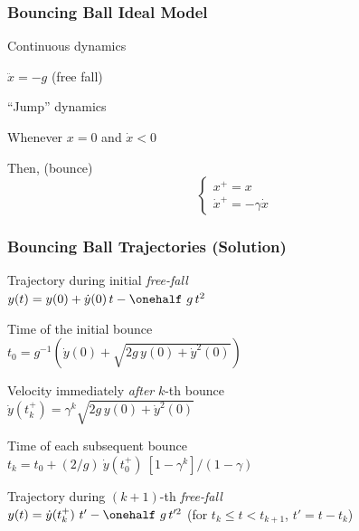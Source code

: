 \documentclass[12pt]{beamer}
\begin{document}
\begin{frame}
\frametitle{Bouncing Ball Ideal Model}

\begin{block}{Continuous dynamics}
\begin{itemize}
\vitem
$\ddot x = -g$ (free fall)
\end{itemize}
\end{block}

\begin{block}{``Jump'' dynamics}
\begin{itemize}
\vitem
Whenever $x = 0$ and $\dot x < 0$

\vitem
Then, (bounce)
\[
\begin{cases}
x^+ = x	\\
\dot x^+ = -\gamma \dot x
\end{cases}
\]
\end{itemize}
\end{block}

\end{frame}




\begin{frame}
\frametitle{Bouncing Ball Trajectories (Solution)}
\fontsize{10pt}{7.2}\selectfont
\begin{itemize}
\vitem
Trajectory during initial \emph{free-fall} \\
$y(t) = y(0) + \dot y(0) \, t - \onehalf \ g \, t^2$

\vitem
Time of the initial bounce \\
$t_0 = g^{-1} \left( \dot y(0) + \sqrt{ 2g \, y(0) + \dot y^2(0)} \right)$

\vitem
Velocity immediately \emph{after} $k$-th bounce \\
$\dot y(t_k^+) = \gamma^k \sqrt{ 2g \, y(0) + \dot y^2(0) }$

\vitem
Time of each subsequent bounce \\
$t_k = t_0 + (2/g) \ \dot y(t_0^+) \ [1-\gamma^k ]/(1-\gamma)$

\vitem Trajectory during $(k+1)$-th \emph{free-fall} \\
$y(t) = \dot y(t_k^+) \ t' - \onehalf \ g \, t'^2$ \hfill (for $t_k \leq t < t_{k+1}$, $t' = t - t_k$)

\end{itemize}

\end{frame}
\end{document}
